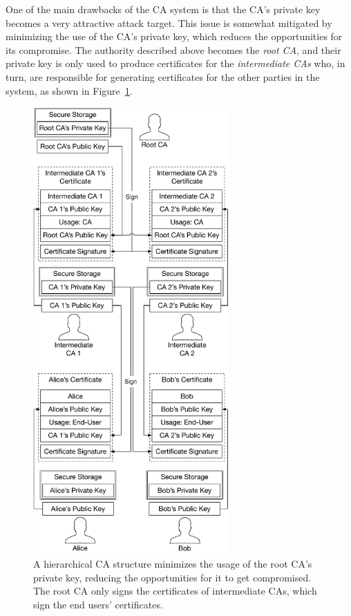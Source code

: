One of the main drawbacks of the CA system is that the CA's private key becomes
a very attractive attack target. This issue is somewhat mitigated by minimizing
the use of the CA's private key, which reduces the opportunities for its
compromise. The authority described above becomes the \textit{root CA}, and
their private key is only used to produce certificates for the
\textit{intermediate CAs} who, in turn, are responsible for generating
certificates for the other parties in the system, as shown in
Figure~\ref{fig:intermediate_cas}.

\begin{figure}[hbtp]
  \centering
  \includegraphics[width=75mm]{figures/intermediate_cas.pdf}
  \caption{
    A hierarchical CA structure minimizes the usage of the root CA's private
    key, reducing the opportunities for it to get compromised. The root CA only
    signs the certificates of intermediate CAs, which sign the end users'
    certificates.
  }
  \label{fig:intermediate_cas}
\end{figure}

